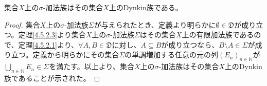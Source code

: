 \documentclass[dvipdfmx]{jsarticle}
\begin{document}
\begin{thm}\label{4.5.6.10}
集合$X$上の$\sigma$-加法族はその集合$X$上のDynkin族である。
\end{thm}
\begin{proof}
集合$X$上の$\sigma$-加法族$\varSigma$が与えられたとき、定義より明らかに$\mathfrak{\emptyset \in D}$が成り立つ。定理\ref{4.5.2.3}より集合$X$上の$\sigma$-加法族$\varSigma$はその集合$X$上の有限加法族であるので、定理\ref{4.5.2.1}より、$\forall A,B\in \mathfrak{D}$に対し、$A \subseteq B$が成り立つなら、$B \setminus A \in \varSigma$が成り立つ。定義から明らかにその集合$\varSigma$の単調増加する任意の元の列$\left( E_{n} \right)_{n \in \mathbb{N}}$が$\bigcup_{n \in \mathbb{N}} E_{n} \in \varSigma$を満たす。以上より、集合$X$上の$\sigma$-加法族はその集合$X$上のDynkin族であることが示された。
\end{proof}
\end{document}
